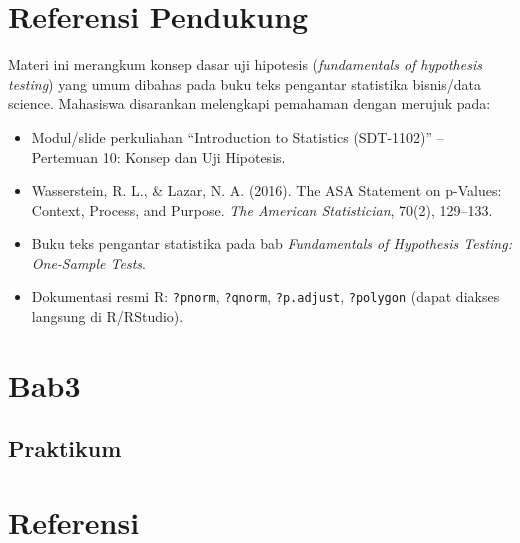 \documentclass[
  indonesian,
  letterpaper,
]{book}
\providecommand{\tightlist}{%
  \setlength{\itemsep}{0pt}\setlength{\parskip}{0pt}}
\begin{document}

\chapter{Referensi Pendukung}\label{referensi-pendukung-1}

Materi ini merangkum konsep dasar uji hipotesis (\emph{fundamentals of
hypothesis testing}) yang umum dibahas pada buku teks pengantar
statistika bisnis/data science. Mahasiswa disarankan melengkapi
pemahaman dengan merujuk pada:

\begin{itemize}
\tightlist
\item
  Modul/slide perkuliahan ``Introduction to Statistics (SDT-1102)'' --
  Pertemuan 10: Konsep dan Uji Hipotesis.
\item
  Wasserstein, R. L., \& Lazar, N. A. (2016). The ASA Statement on
  p-Values: Context, Process, and Purpose. \emph{The American
  Statistician}, 70(2), 129--133.
\item
  Buku teks pengantar statistika pada bab \emph{Fundamentals of
  Hypothesis Testing: One-Sample Tests}.
\item
  Dokumentasi resmi R: \texttt{?pnorm}, \texttt{?qnorm},
  \texttt{?p.adjust}, \texttt{?polygon} (dapat diakses langsung di
  R/RStudio).
\end{itemize}


\chapter{Bab3}\label{bab3}

\section{Praktikum}\label{praktikum}


\chapter*{Referensi}\label{referensi}


\protect{}\label{refs}


\backmatter
\end{document}
